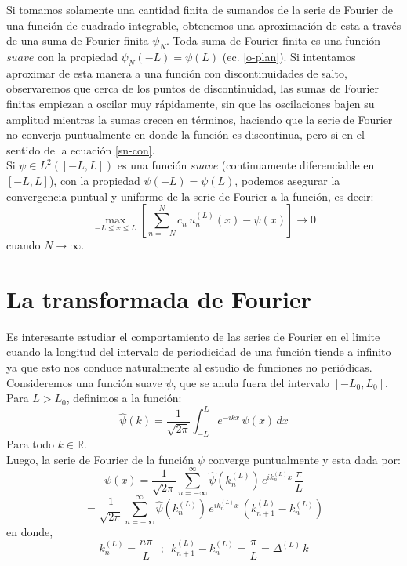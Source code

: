 \documentclass[12pt]{book}
\numberwithin{equation}{chapter}
\def\R{\mathbb{R}}
\def\rar{\rightarrow}
\begin{document}
Si tomamos solamente una cantidad finita de sumandos de la serie de Fourier de una funci\'on de cuadrado integrable, obtenemos una aproximaci\'on de esta a trav\'es de una suma de Fourier finita $\psi_{N}$. Toda suma de Fourier finita es una funci\'on $suave$ con la propiedad $ \psi_{N}(-L)= \psi(L) $ (ec. \eqref{o-plan}). Si intentamos aproximar de esta manera a una funci\'on con discontinuidades de salto, observaremos que cerca de los puntos de discontinuidad, las sumas de Fourier finitas empiezan a oscilar muy r\'apidamente, sin que las oscilaciones bajen su amplitud mientras la sumas crecen en t\'erminos, haciendo que la serie de Fourier no converja puntualmente en donde la funci\'on es discontinua, pero si en el sentido de la ecuaci\'on \eqref{sn-con}.\\

Si $\psi \in L^{2}([-L,L])$ es una funci\'on $suave$ (continuamente diferenciable en $[-L,L]$), con la propiedad $\psi(-L) = \psi(L) $, podemos asegurar la convergencia puntual y uniforme de la serie de Fourier a la funci\'on, es decir:
\begin{equation}
\max_{-L\leq x \leq L} \left[ \sum_{n=-N}^{N} c_{n}\, u_{n}^{(L)}(x) - \psi(x) \right] \rar 0
\end{equation}
cuando $N \rar \infty$.

\newpage

\section{La transformada de Fourier}
Es interesante estudiar el comportamiento de las series de Fourier en el limite cuando la longitud del intervalo de periodicidad de una funci\'on tiende a infinito ya que esto nos conduce naturalmente al estudio de funciones no peri\'odicas.\\

Consideremos una funci\'on suave $\psi$, que se anula fuera del intervalo $[-L_{0},L_{0}]$. Para $L> L_{0}$, definimos a la funci\'on:
\begin{equation}\label{ftran}
\hat{\psi}(k)= \frac{1}{\sqrt{2 \pi}} \int_{-L}^{L} e^{-ikx}\, \psi(x)\, dx
\end{equation}
Para todo $k \in \R$.\\
Luego, la serie de Fourier de la funci\'on $\psi$ converge puntualmente y esta dada por:
$$\psi(x) = \frac{1}{\sqrt{2\pi}} \sum_{n=-\infty}^{\infty} \hat{\psi}(k_{n}^{(L)})\, e^{ik_{n}^{(L)}x} \, \frac{\pi}{L} $$
\begin{equation}\label{rsum}
= \frac{1}{\sqrt{2\pi}} \sum_{n=-\infty}^{\infty} \hat{\psi}(k_{n}^{(L)})\, e^{ik_{n}^{(L)}x} \, ( k_{n+1}^{(L)} - k_{n}^{(L)})
\end{equation}
en donde,
$$ k_{n}^{(L)}= \frac{n\pi}{L} \,\,\,\,;\,\,\, k_{n+1}^{(L)}-k_{n}^{(L)}= \frac{\pi}{L}= \Delta^{(L)}\, k $$
\end{document}
